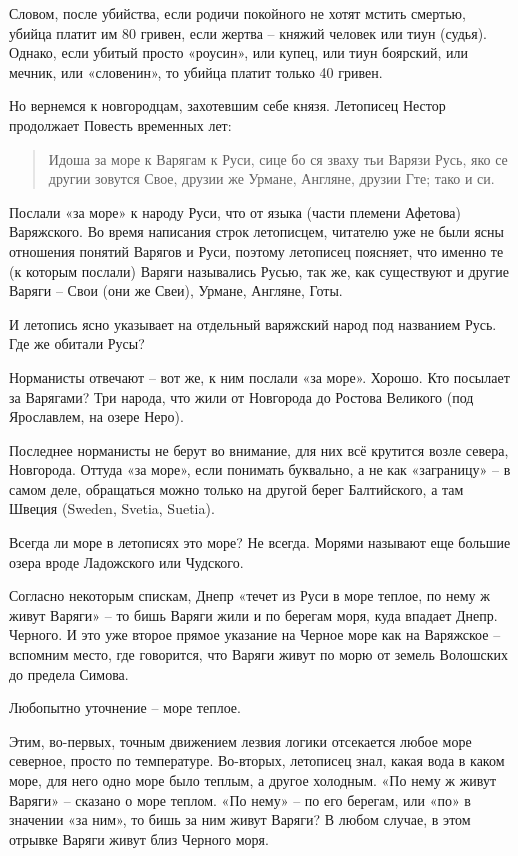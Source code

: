 Словом, после убийства, если родичи покойного не хотят мстить смертью, убийца платит им 80 гривен, если жертва – княжий человек или тиун (судья). Однако, если убитый просто «роусин», или купец, или тиун боярский, или мечник, или «словенин», то убийца платит только 40 гривен.

Но вернемся к новгородцам, захотевшим себе князя. Летописец Нестор продолжает Повесть временных лет:

\begin{quotation}
Идоша за море к Варягам к Руси, сице бо ся зваху тьи Варязи Русь, яко се другии зовутся Свое, друзии же Урмане, Англяне, друзии Гте; тако и си.
\end{quotation}

Послали «за море» к народу Руси, что от языка (части племени Афетова) Варяжского. Во время написания строк летописцем, читателю уже не были ясны отношения понятий Варягов и Руси, поэтому летописец поясняет, что именно те (к которым послали) Варяги назывались Русью, так же, как существуют и другие Варяги – Свои (они же Свеи), Урмане, Англяне, Готы.

И летопись ясно указывает на отдельный варяжский народ под названием Русь. Где же обитали Русы?

Норманисты отвечают – вот же, к ним послали «за море». Хорошо. Кто посылает за Варягами? Три народа, что жили от Новгорода до Ростова Великого (под Ярославлем, на озере Неро).

Последнее норманисты не берут во внимание, для них всё крутится возле севера, Новгорода. Оттуда «за море», если понимать буквально, а не как «заграницу» – в самом деле, обращаться можно только на другой берег Балтийского, а там Швеция (Sweden, Svetia, Suetia).

Всегда ли море в летописях это море? Не всегда. Морями называют еще большие озера вроде Ладожского или Чудского. 


Согласно некоторым спискам, Днепр «течет из Руси в море теплое, по нему ж живут Варяги» – то бишь Варяги жили и по берегам моря, куда впадает Днепр. Черного. И это уже второе прямое указание на Черное море как на Варяжское – вспомним место, где говорится, что Варяги живут по морю от земель Волошских до предела Симова.

Любопытно уточнение – море теплое.

Этим, во-первых, точным движением лезвия логики отсекается любое море северное, просто по температуре. Во-вторых, летописец знал, какая вода в каком море, для него одно море было теплым, а другое холодным. «По нему ж живут Варяги» – сказано о море теплом. «По нему» – по его берегам, или «по» в значении «за ним», то бишь за ним живут Варяги? В любом случае, в этом отрывке Варяги живут близ Черного моря.

